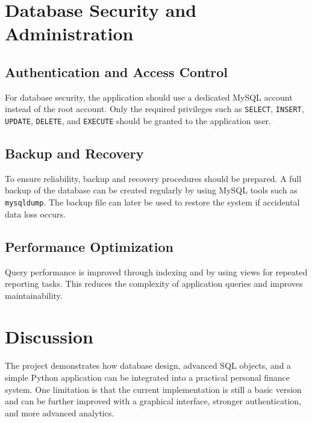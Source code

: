 \section{Database Security and Administration}

\subsection{Authentication and Access Control}
For database security, the application should use a dedicated MySQL account instead of the root account. Only the required privileges such as \texttt{SELECT}, \texttt{INSERT}, \texttt{UPDATE}, \texttt{DELETE}, and \texttt{EXECUTE} should be granted to the application user.

\subsection{Backup and Recovery}
To ensure reliability, backup and recovery procedures should be prepared. A full backup of the database can be created regularly by using MySQL tools such as \texttt{mysqldump}. The backup file can later be used to restore the system if accidental data loss occurs.

\subsection{Performance Optimization}
Query performance is improved through indexing and by using views for repeated reporting tasks. This reduces the complexity of application queries and improves maintainability.

\section{Discussion}
The project demonstrates how database design, advanced SQL objects, and a simple Python application can be integrated into a practical personal finance system. One limitation is that the current implementation is still a basic version and can be further improved with a graphical interface, stronger authentication, and more advanced analytics.
